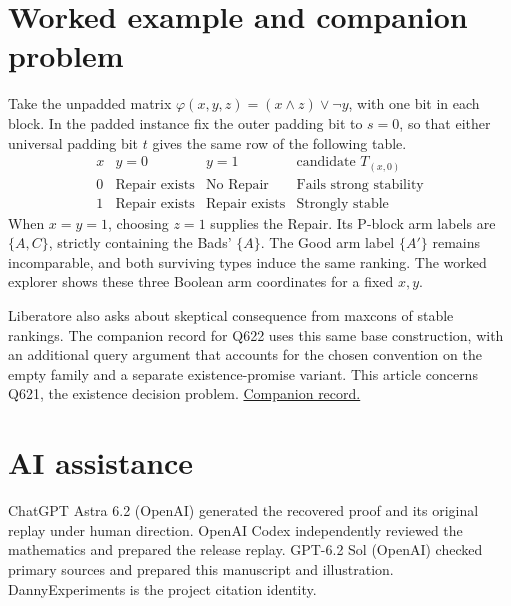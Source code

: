 \documentclass[11pt,a4paper]{amsart}
\begin{document}
\section{Worked example and companion problem}
Take the unpadded matrix $\varphi(x,y,z)=(x\wedge z)\vee\neg y$, with one bit in each block. In the padded instance fix the outer padding bit to $s=0$, so that either universal padding bit $t$ gives the same row of the following table.
\[
\begin{array}{c|cc|l}
 x& y=0&y=1&\text{candidate }T_{(x,0)}\\ \hline
 0&\text{Repair exists}&\text{No Repair}&\text{Fails strong stability}\\
 1&\text{Repair exists}&\text{Repair exists}&\text{Strongly stable}
\end{array}
\]
When $x=y=1$, choosing $z=1$ supplies the Repair. Its P-block arm labels are $\{A,C\}$, strictly containing the Bads' $\{A\}$. The Good arm label $\{A'\}$ remains incomparable, and both surviving types induce the same ranking. The worked explorer shows these three Boolean arm coordinates for a fixed $x,y$.

Liberatore also asks about skeptical consequence from maxcons of stable rankings. The companion record for Q622 uses this same base construction, with an additional query argument that accounts for the chosen convention on the empty family and a separate existence-promise variant. This article concerns Q621, the existence decision problem. \href{https://doi.org/10.5281/zenodo.24572374}{Companion record.}

\section*{AI assistance}
ChatGPT Astra 6.2 (OpenAI) generated the recovered proof and its original replay under human direction. OpenAI Codex independently reviewed the mathematics and prepared the release replay. GPT-6.2 Sol (OpenAI) checked primary sources and prepared this manuscript and illustration. DannyExperiments is the project citation identity.



\end{document}
